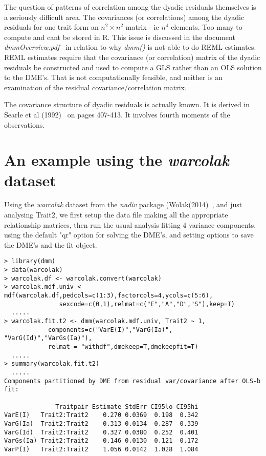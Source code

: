\documentclass[titlepage]{article}  %
\begin{document}
The question of patterns of correlation among the dyadic residuals themselves is a seriously difficult area. The covariances (or correlations) among the dyadic residuals for one trait form an $n^{2} \times n^{2}$ matrix - ie $n^{4}$ elements. Too many to compute and cant be stored in R. This issue is discussed in the document {\em dmmOverview.pdf}~\cite{jack:15} in relation to why {\em dmm()} is not able to do REML estimates. REML estimates require that the covariance (or correlation) matrix of the dyadic residuals be constructed and used to compute a GLS rather than an OLS solution to the DME's. That is not computationally feasible, and neither is an examination of the residual covariance/correlation matrix.

The covariance structure of dyadic residuals is actually known. It is derived in Searle et al (1992)~\cite{sear:92} on pages 407-413. It involves fourth moments of the observations.

\section{An example using the {\em warcolak} dataset}
Using the {\em warcolak} dataset from the {\em nadiv} package (Wolak(2014)~\cite{wola:14}, and just analysing Trait2, we first setup the data file making all the appropriate relationship matrices, then run the usual analysis fitting 4 variance components,  using the default "qr" option for solving the DME's, and setting options to save the DME's and the fit object.

\begin{verbatim}
> library(dmm)
> data(warcolak)
> warcolak.df <- warcolak.convert(warcolak)
> warcolak.mdf.univ <- mdf(warcolak.df,pedcols=c(1:3),factorcols=4,ycols=c(5:6),
               sexcode=c(0,1),relmat=c("E","A","D","S"),keep=T)
  .....
> warcolak.fit.t2 <- dmm(warcolak.mdf.univ, Trait2 ~ 1,
            components=c("VarE(I)","VarG(Ia)", "VarG(Id)","VarGs(Ia)"),
            relmat = "withdf",dmekeep=T,dmekeepfit=T)
  .....
> summary(warcolak.fit.t2)
  .....
Components partitioned by DME from residual var/covariance after OLS-b fit:

              Traitpair Estimate StdErr CI95lo CI95hi
VarE(I)   Trait2:Trait2    0.270 0.0369  0.198  0.342
VarG(Ia)  Trait2:Trait2    0.313 0.0134  0.287  0.339
VarG(Id)  Trait2:Trait2    0.327 0.0380  0.252  0.401
VarGs(Ia) Trait2:Trait2    0.146 0.0130  0.121  0.172
VarP(I)   Trait2:Trait2    1.056 0.0142  1.028  1.084

\end{verbatim}
\end{document}
